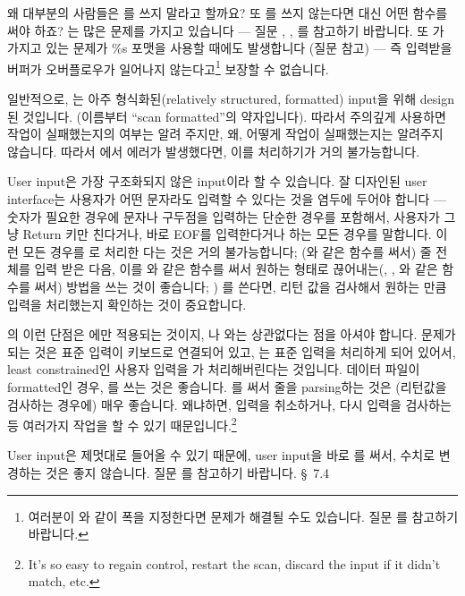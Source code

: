 \begin{faq}
	왜 대부분의 사람들은 를 쓰지 말라고 할까요?
	또 를 쓰지 않는다면 대신 어떤 함수를 써야 하죠?
\A
	는 많은 문제를 가지고 있습니다 --- 질문 , ,
	를 참고하기 바랍니다.  또 가 가지고 있는 문제가
	\%s 포맷을 사용할 때에도 발생합니다 (질문  참고) --- 즉
	입력받을 버퍼가 오버플로우가 일어나지 않는다고\footnote{여러분이
	와 같이 폭을 지정한다면 문제가 해결될 수도 있습니다.
	질문 를 참고하기 바랍니다.} 보장할 수 없습니다.

	일반적으로, 는 아주 형식화된(relatively structured,
	formatted) input을 위해 design된 것입니다.
	(이름부터 ``scan formatted''의 약자입니다).  따라서
	주의깊게 사용하면 작업이 실패했는지의 여부는 알려 주지만, 
	왜, 어떻게 
	작업이 실패했는지는 알려주지 않습니다. 
	따라서 에서 에러가 발생했다면, 이를 처리하기가
	거의 불가능합니다.

	User input은 가장 구조화되지 않은 input이라 할 수 있습니다.
	잘 디자인된 user interface는 사용자가 어떤 문자라도 입력할 수 있다는
	것을 염두에 두어야 합니다 --- 숫자가 필요한 경우에 문자나 구두점을
	입력하는 단순한 경우를 포함해서, 사용자가 그냥 Return 키만 친다거나,
	바로 EOF를 입력한다거나 하는 모든 경우를 말합니다.
	이런 모든 경우를 로 처리한 다는 것은 거의 불가능합니다;
	(와	같은 함수를 써서) 줄 전체를 입력 받은 다음,
	이를 와 같은 함수를 써서
	원하는 형태로 끊어내는(, , 와 같은
	함수를 써서) 방법을 쓰는 것이 좋습니다; )
	를 쓴다면, 리턴 값을 검사해서 원하는 만큼 입력을 처리했는지
	확인하는 것이 중요합니다.

	의 이런 단점은 에만 적용되는 것이지, 나
	와는 상관없다는 점을 아셔야 합니다.
	문제가 되는 것은 표준 입력이 키보드로 연결되어 있고, 는
	표준 입력을 처리하게 되어 있어서, least constrained인 사용자 입력을
	가 처리해버린다는 것입니다.
	데이터 파일이 formatted인 경우, 를 쓰는 것은 좋습니다.
	를 써서 줄을 parsing하는 것은 (리턴값을 검사하는 경우에)
	매우 좋습니다.  왜냐하면, 입력을 취소하거나, 다시 입력을 검사하는 등
	여러가지 작업을 할 수 있기 때문입니다.\footnote{It's so easy to
	regain control, restart the scan, discard the input if it didn't
	match, etc.}

\T
	User input은 제멋대로 들어올 수 있기 때문에, user input을
	바로 를 써서, 수치로 변경하는 것은 좋지 않습니다.
	질문 를 참고하기 바랍니다.
\R
	\cite{kr2} \S\ 7.4 
\end{faq}

